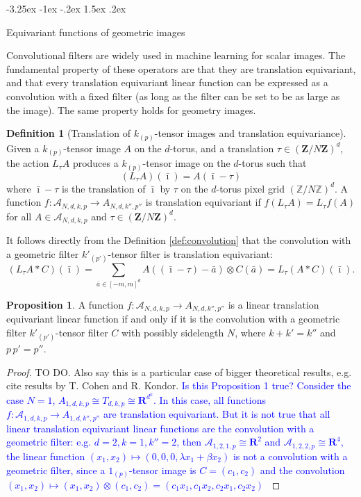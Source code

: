 \documentclass{article}
\makeatletter
\theoremstyle{definition}
\newtheorem{definition}{Definition}
\newtheorem{proposition}{Proposition}
\newcommand{\tensorname}[2]{{#1}_{(#2)}}
\newcommand{\tensor}[2]{$\tensorname{#1}{#2}$-tensor}
\renewcommand\section{\@startsection {section}{1}{\z@}%
  {-3.25ex \@plus -1ex \@minus -.2ex}%
  {1.5ex \@plus .2ex}%
  {\raggedright\normalfont\large\bfseries}}%
\makeatother
\begin{document}
\section{Equivariant functions of geometric images}\label{sec:equivariant}


Convolutional filters are widely used in machine learning for scalar images. The fundamental property of these operators are that they are translation equivariant, and that every translation equivariant linear function can be expressed as a convolution with a fixed filter (as long as the filter can be set to be as large as the image). The same property holds for geometry images.

\begin{definition}[Translation of \tensor{k}{p} images and translation equivariance] Given a \tensor{k}{p} image $A$ on the $d$-torus, and a translation $\tau \in (\mathbf{Z}/N \mathbf{Z})^d$, the action $L_\tau A$ produces a \tensor{k}{p} image on the $d$-torus such that
\begin{equation}
    (L_\tau A)(\bar \imath) = A(\bar \imath-\tau)
\end{equation}
where $\bar\imath - \tau $ is the translation of $\bar\imath$ by $\tau$ on the $d$-torus pixel grid $(\mathbb Z / N\mathbb Z)^d$.
A function $f:\mathcal A_{N,d,k,p}\to A_{N,d, k'', p''}$ is translation equivariant if $f(L_\tau A) = L_\tau f(A)$ for all $A\in \mathcal A_{N,d,k,p}$ and $ \tau \in (\mathbf{Z}/N \mathbf{Z})^d$.
\end{definition}
It follows directly from the Definition \ref{def:convolution} that the convolution with a geometric filter \tensor{k'}{p'} filter is translation equivariant:
\begin{equation*}
    (L_\tau A\ast C)(\bar\imath) = \sum_{\bar a\in[-m, m]^d} A((\bar\imath-\tau) - \bar a)\otimes C(\bar a)= L_\tau (A\ast C)(\bar \imath).
\end{equation*}

\begin{proposition}
A function $f:\mathcal A_{N,d,k,p}\to A_{N,d, k'', p''}$ is a linear translation equivariant linear function if and only if it is the convolution with a geometric filter \tensor{k'}{p'} filter $C$ with possibly sidelength $N$, where $k+k'=k''$ and $p\,p'=p''$.
\end{proposition}
\begin{proof}
TO DO. Also say this is a particular case of bigger theoretical results, e.g. cite results by T. Cohen and R. Kondor. \textcolor{blue}{Is this Proposition 1 true? Consider the case $N=1$, $A_{1,d,k,p}\cong T_{d,k,p} \cong \mathbf{R}^{d^k}$. In this case, all functions $f:\mathcal A_{1,d,k,p}\to A_{1,d, k'', p''}$ are translation equivariant. But it is not true that all linear translation equivariant linear functions are the convolution with a geometric filter: e.g. $d=2, k=1, k''=2$, then $\mathcal A_{1,2,1,p}\cong \mathbf{R}^2$ and $\mathcal A_{1,2,2,p}\cong \mathbf{R}^4$, the linear function
$(x_1,x_2)\mapsto (0,0,0, \lambda x_1+\beta x_2)$ is not a convolution with a geometric filter, since a \tensor{1}{p} image is $C=(c_1, c_2)$ and the convolution $(x_1,x_2)\mapsto (x_1,x_2)\otimes(c_1,c_2)=(c_1x_1, c_1x_2, c_2x_1, c_2x_2)$ }
\end{proof}
\end{document}
